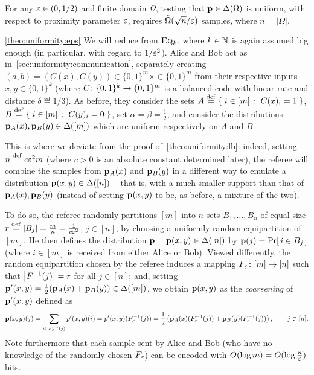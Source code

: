 \begin{theorem}\label{theo:uniformity:eps}
For any $\eps\in(0,1/2)$ and finite domain $\Omega$, testing that $\p\in \distribs{\Omega}$ is uniform, with respect to proximity parameter $\eps$, requires $\tildeOmega{\sqrt{n}/\eps}$ samples, where $n = |\Omega|$.
\end{theorem}
\begin{proofof}{\cref{theo:uniformity:eps}}
We will reduce from $\EQ[k]$, where $k\in\N$ is again assumed big enough (in particular, with regard to $1/\eps^2$). Alice and Bob act as in~\cref{sec:uniformity:communication}, separately creating $(a,b)=(C(x),C(y))\in\{0,1\}^m\times \in\{0,1\}^m$ from their respective inputs $x,y\in \{0,1\}^k$ (where $C\colon \bitset^k \to \bitset^m$ is a balanced code with linear rate and distance $\delta\eqdef 1/3$). As before, they consider the sets $A\eqdef \setOfSuchThat{ i\in[m] }{ C(x)_i=1 }$, $B\eqdef \setOfSuchThat{ i\in[m] }{ C(y)_i=0 }$, set $\alpha=\beta=\frac{1}{2}$, and consider the distributions $\p_A(x),\p_B(y)\in\distribs{[m]}$ which are uniform respectively on $A$ and $B$.

This is where we deviate from the proof of~\cref{theo:uniformity:lb}: indeed, setting $n\eqdef c \eps^2 m$ (where $c>0$ is an absolute constant determined later), the referee will combine the samples from $\p_A(x)$ and $\p_B(y)$ in a different way to emulate a distribution $\p(x,y)\in\distribs{[n]}$ -- that is, with a much smaller support than that of $\p_A(x),\p_B(y)$ (instead of setting $\p(x,y)$ to be, as before, a mixture of the two).

To do so, the referee randomly partitions $[m]$ into $n$ sets $B_1,\dots, B_n$ of equal size $r\eqdef \abs{B_j} = \frac{m}{n} = \frac{1}{c\eps^2}$, $j\in[n]$, by choosing a uniformly random equipartition of $[m]$. He then defines the distribution $\p=\p(x,y)\in\distribs{[n]}$ by $\p(j) = \probaOf{ i \in B_j }$ (where $i\in[m]$ is received from either Alice or Bob). Viewed differently, the random equipartition chosen by the referee induces a mapping $F_\eps\colon [m] \to [n]$ such that $\abs{F^{-1}(j)} = r$ for all $j\in[n]$; and, setting $\p'(x,y) = \frac{1}{2}(\p_A(x)+\p_B(y))\in\distribs{[m]}$, we obtain $\p(x,y)$ as the \emph{coarsening} of $\p'(x,y)$ defined as
\[
    \p(x,y)(j) = \sum_{i\in F_\eps^{-1}(j)} p'(x,y)(i) = p'(x,y)( F_\eps^{-1}(j) ) = \frac{1}{2}\left( \p_A(x)( F_\eps^{-1}(j) ) +\p_B(y)( F_\eps^{-1}(j) ) \right), \qquad j\in [n].
\]
Note furthermore that each sample sent by Alice and Bob (who have no knowledge of the randomly chosen $F_\eps$) can be encoded with $O(\log m) = O(\log\frac{n}{\eps})$ bits.


\end{proofof}
